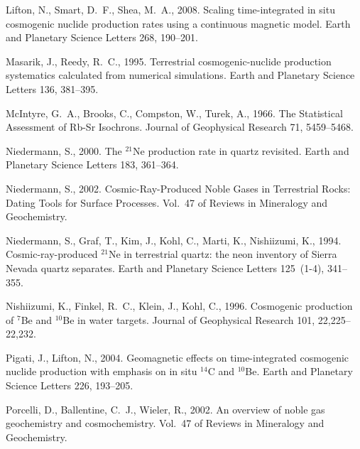 \documentclass{article}
\begin{document}
\begin{thebibliography}{34}
Lifton, N., Smart, D.~F., Shea, M.~A., 2008. Scaling time-integrated in situ
  cosmogenic nuclide production rates using a continuous magnetic model. Earth
  and Planetary Science Letters 268, 190--201.

{Masarik}, J., {Reedy}, R.~C., 1995. {Terrestrial cosmogenic-nuclide production
  systematics calculated from numerical simulations}. Earth and Planetary
  Science Letters 136, 381--395.

{McIntyre}, G.~A., {Brooks}, C., {Compston}, W., {Turek}, A., 1966. {The
  Statistical Assessment of Rb-Sr Isochrons}. Journal of Geophysical Research
  71, 5459--5468.

{Niedermann}, S., 2000. {The $^{21}${N}e production rate in quartz revisited}.
  Earth and Planetary Science Letters 183, 361--364.

Niedermann, S., 2002. {Cosmic-Ray-Produced Noble Gases in Terrestrial Rocks:
  Dating Tools for Surface Processes}. Vol.~47 of Reviews in Mineralogy and
  Geochemistry.

Niedermann, S., Graf, T., Kim, J., Kohl, C., Marti, K., Nishiizumi, K., 1994.
  Cosmic-ray-produced $^{21}${N}e in terrestrial quartz: the neon inventory of
  {S}ierra {N}evada quartz separates. Earth and Planetary Science Letters
  125~(1-4), 341--355.

Nishiizumi, K., Finkel, R.~C., Klein, J., Kohl, C., 1996. Cosmogenic production
  of $^7${B}e and $^{10}${B}e in water targets. Journal of Geophysical Research
  101, 22,225--22,232.

Pigati, J., Lifton, N., 2004. Geomagnetic effects on time-integrated cosmogenic
  nuclide production with emphasis on in situ $^{14}${C} and $^{10}${B}e. Earth
  and Planetary Science Letters 226, 193--205.

Porcelli, D., Ballentine, C.~J., Wieler, R., 2002. An overview of noble gas
  geochemistry and cosmochemistry. Vol.~47 of Reviews in Mineralogy and
  Geochemistry.


\end{thebibliography}
\end{document}

